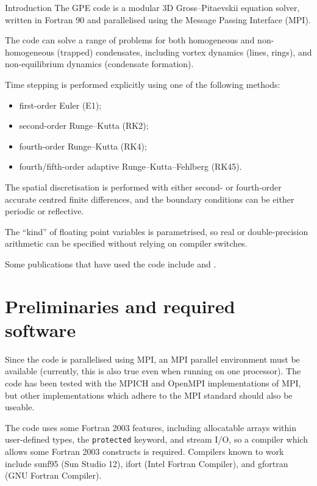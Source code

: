 
\begin{chapter}{\label{cha:introduction}Introduction}
  The GPE code is a modular 3D Gross--Pitaevskii equation solver, written in
  Fortran 90 and parallelised using the Message Passing Interface (MPI).
  
  The code can solve a range of problems for both homogeneous and
  non-homogeneous (trapped) condensates, including vortex dynamics (lines,
  rings), and non-equilibrium dynamics (condensate formation).

  Time stepping is performed explicitly using one of the following methods:
  \begin{itemize}
    \item first-order Euler (E1);
    \item second-order Runge--Kutta (RK2);
    \item fourth-order Runge--Kutta (RK4);
    \item fourth/fifth-order adaptive Runge--Kutta--Fehlberg (RK45).
  \end{itemize}
  The spatial discretisation is performed with either second- or fourth-order
  accurate centred finite differences, and the boundary conditions can be
  either periodic or reflective.

  The ``kind'' of floating point variables is parametrised, so real or
  double-precision arithmetic can be specified without relying on compiler
  switches.

  Some publications that have used the code include \citet{AYB08} and
  \citet{WBPYW10}.

  \section{\label{sec:prelim}Preliminaries and required software}
  Since the code is parallelised using MPI, an MPI parallel environment must be
  available (currently, this is also true even when running on one processor).
  The code has been tested with the MPICH and OpenMPI implementations of MPI,
  but other implementations which adhere to the MPI standard should also be
  useable.

  The code uses some Fortran 2003 features, including allocatable arrays within
  user-defined types, the \verb"protected" keyword, and stream I/O, so a
  compiler which allows some Fortran 2003 constructs is required.  Compilers
  known to work include sunf95 (Sun Studio 12), ifort (Intel Fortran Compiler),
  and gfortran (GNU Fortran Compiler).


\end{chapter}
